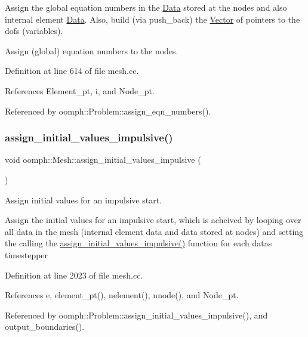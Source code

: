 Assign the global equation numbers in the \hyperlink{classoomph_1_1Data}{Data} stored at the nodes and also internal element \hyperlink{classoomph_1_1Data}{Data}. Also, build (via push\+\_\+back) the \hyperlink{classoomph_1_1Vector}{Vector} of pointers to the dofs (variables). 

Assign (global) equation numbers to the nodes. 

Definition at line 614 of file mesh.\+cc.



References Element\+\_\+pt, i, and Node\+\_\+pt.



Referenced by oomph\+::\+Problem\+::assign\+\_\+eqn\+\_\+numbers().

\mbox{\label{classoomph_1_1Mesh_ab1ceceaadc7114773f5a70cb52e67081}} 
\subsubsection{\texorpdfstring{assign\+\_\+initial\+\_\+values\+\_\+impulsive()}{assign\_initial\_values\_impulsive()}}
{\footnotesize\ttfamily void oomph\+::\+Mesh\+::assign\+\_\+initial\+\_\+values\+\_\+impulsive (\begin{DoxyParamCaption}{ }\end{DoxyParamCaption})}



Assign initial values for an impulsive start. 

Assign the initial values for an impulsive start, which is acheived by looping over all data in the mesh (internal element data and data stored at nodes) and setting the calling the \hyperlink{classoomph_1_1Mesh_ab1ceceaadc7114773f5a70cb52e67081}{assign\+\_\+initial\+\_\+values\+\_\+impulsive()} function for each data\textquotesingle{}s timestepper 

Definition at line 2023 of file mesh.\+cc.



References e, element\+\_\+pt(), nelement(), nnode(), and Node\+\_\+pt.



Referenced by oomph\+::\+Problem\+::assign\+\_\+initial\+\_\+values\+\_\+impulsive(), and output\+\_\+boundaries().

